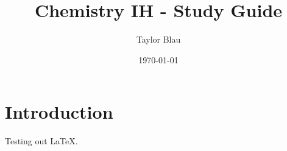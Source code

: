 \documentclass[12pt,letterpaper,titlepage]{report}
\title{Chemistry IH - Study Guide}
\author{Taylor Blau}
\date{\today}
\begin{document}
\maketitle

\section{Introduction}

Testing out LaTeX.
\end{document}
